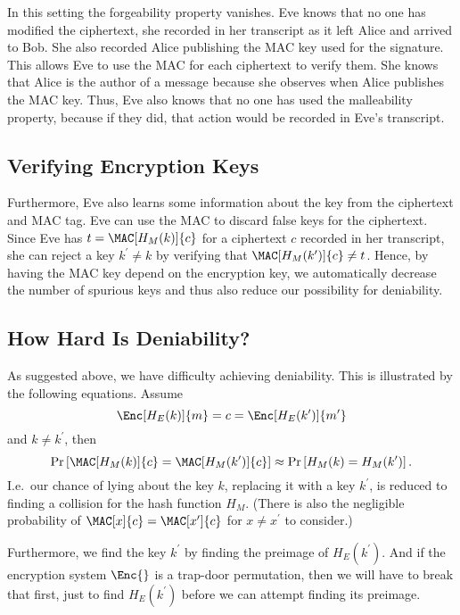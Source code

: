 In this setting the forgeability property vanishes.
Eve knows that no one has modified the ciphertext, she recorded in her 
transcript as it left Alice and arrived to Bob.
She also recorded Alice publishing the \ac{MAC} key used for the signature.
This allows Eve to use the \ac{MAC} for each ciphertext to verify them.
She knows that Alice is the author of a message because she observes when Alice 
publishes the \ac{MAC} key.
Thus, Eve also knows that no one has used the malleability property, because if 
they did, that action would be recorded in Eve's transcript.

\subsection{Verifying Encryption Keys}
\label{VerifyingKeys}

Furthermore, Eve also learns some information about the key from the ciphertext 
and \ac{MAC} tag.
Eve can use the \ac{MAC} to discard false keys for the ciphertext.
Since Eve has \(t = \MAC[H_M( k )]{ c }\) for a ciphertext \(c\) recorded in 
her transcript, she can reject a key \(k^\prime\neq k\) by verifying that
\(\MAC[H_M( k^\prime )]{ c } \neq t\).
Hence, by having the \ac{MAC} key depend on the encryption key, we 
automatically decrease the number of spurious keys and thus also reduce our 
possibility for deniability.

\subsection{How Hard Is Deniability?}
\label{HardnessOfDeniability}

As suggested above, we have difficulty achieving deniability.
This is illustrated by the following equations.
Assume
\begin{equation*}
  \Enc[H_E(k)]{m} = c = \Enc[H_E(k^\prime)]{m^\prime}
\end{equation*}
and \(k\neq k^\prime\), then
\begin{equation*}
  \Pr\left[
    \MAC[H_M(k)]{c} = \MAC[H_M(k^\prime)]{c}
  \right]
  \approx
  \Pr\left[ H_M(k) = H_M(k^\prime) \right].
\end{equation*}
I.e.~our chance of lying about the key \(k\), replacing it with a key 
\(k^\prime\), is reduced to finding a collision for the hash function \(H_M\).
(There is also the negligible probability of \(\MAC[x]{c} = \MAC[x^\prime]{c}\) 
for \(x\neq x^\prime\) to consider.)

Furthermore, we find the key \(k^\prime\) by finding the preimage of \(H_E( 
k^\prime )\).
And if the encryption system \(\Enc{}\) is a trap-door permutation, then we 
will have to break that first, just to find \(H_E( k^\prime )\) before we can 
attempt finding its preimage.



